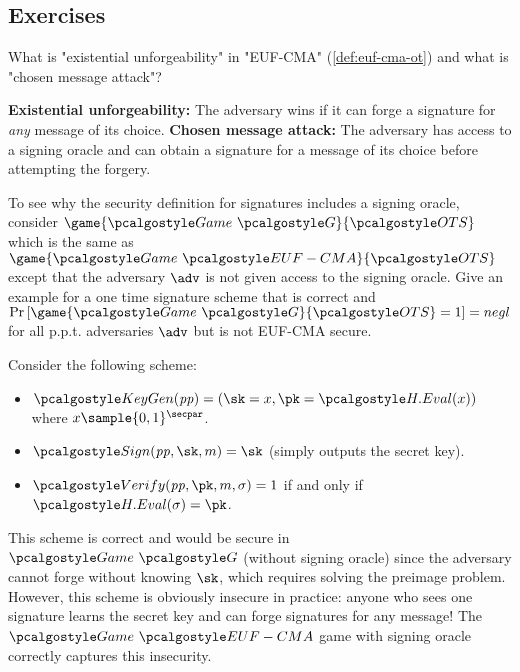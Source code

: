 \subsection{Exercises}

\begin{exercise}
  What is "existential unforgeability" in "EUF-CMA" (\autoref{def:euf-cma-ot}) and what is "chosen message attack"?
\end{exercise}

\ifsolutions
\begin{mysolution}
  \textbf{Existential unforgeability:} The adversary wins if it can forge a signature for \emph{any} message of its choice.
  \textbf{Chosen message attack:} The adversary has access to a signing oracle and can obtain a signature for a message of its choice before attempting the forgery.
\end{mysolution}
\fi

\begin{exercise}
  To see why the security definition for signatures includes a signing oracle, consider $\game{\Game~\algo{G}}{\algo{OTS}}$ which is the same as $\game{\Game~\algo{EUF-CMA}}{\algo{OTS}}$ except that the adversary $\adv$ is not given access to the signing oracle.
  Give an example for a one time signature scheme that is correct and $\pr{\game{\Game~\algo{G}}{\algo{OTS}} = 1} = negl$ for all p.p.t. adversaries $\adv$ but is not EUF-CMA secure.
\end{exercise}

\ifsolutions
\begin{mysolution}
  Consider the following scheme:
  \begin{itemize}
      \item $\algo{KeyGen}(\params) = (\sk = x, \pk = \algo{H.Eval}(x))$ where $x \sample \{0,1\}^\secpar$.
      \item $\algo{Sign}(\params, \sk, m) = \sk$ (simply outputs the secret key).
      \item $\algo{Verify}(\params, \pk, m, \sigma) = 1$ if and only if $\algo{H.Eval}(\sigma) = \pk$.
  \end{itemize}
  This scheme is correct and would be secure in $\Game~\algo{G}$ (without signing oracle) since the adversary cannot forge without knowing $\sk$, which requires solving the preimage problem.
  However, this scheme is obviously insecure in practice: anyone who sees one signature learns the secret key and can forge signatures for any message!
  The $\Game~\algo{EUF-CMA}$ game with signing oracle correctly captures this insecurity.
\end{mysolution}
\fi

